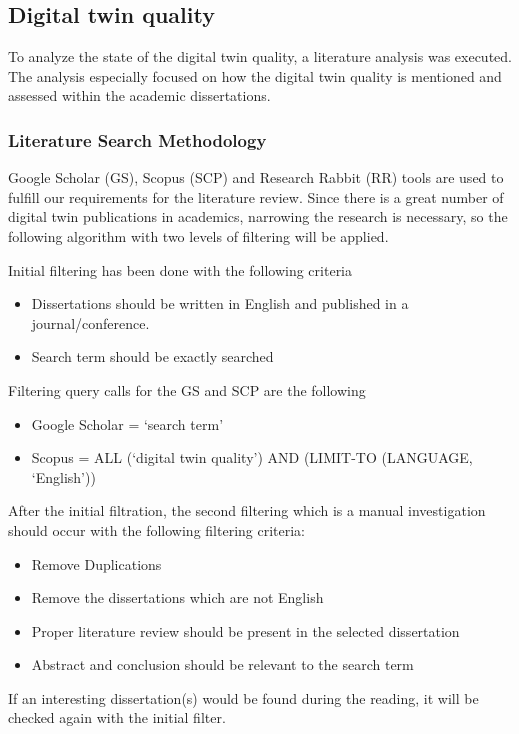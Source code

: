 \documentclass{llncs}
\begin{document}
    \subsection*{Digital twin quality}
    To analyze the state of the digital twin quality, a literature analysis was executed. 
    The analysis especially focused on how the digital twin quality is mentioned and assessed within the academic dissertations.

    \subsubsection*{Literature Search Methodology}
    Google Scholar (GS), Scopus (SCP) and Research Rabbit (RR) tools are used to fulfill our requirements for the literature review. Since there is a great number of digital twin publications in academics,
    narrowing the research is necessary, so the following algorithm with two levels of filtering will be applied.

    Initial filtering has been done with the following criteria
    \begin{itemize}
        \item  Dissertations should be written in English and published in a journal/conference.
        \item  Search term should be exactly searched
    \end{itemize}
    Filtering query calls for the GS and SCP are the following
    \begin{itemize}
        \item Google Scholar = `search term'
        \item Scopus = ALL (`digital twin quality') AND (LIMIT-TO (LANGUAGE, `English'))
    \end{itemize}
    After the initial filtration, the second filtering which is a manual investigation should occur with the following filtering criteria:
    \begin{itemize}
        \item  Remove Duplications
        \item  Remove the dissertations which are not English
        \item  Proper literature review should be present in the selected dissertation
        \item  Abstract and conclusion should be relevant to the search term
    \end{itemize}

    If an interesting dissertation(s) would be found during the reading, it will be checked again with the initial filter.
\end{document}
